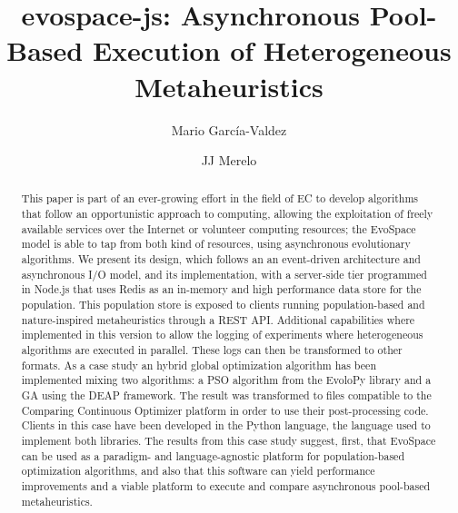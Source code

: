 \documentclass[sigconf]{acmart}
\begin{document}
\title{evospace-js: Asynchronous Pool-Based Execution of Heterogeneous Metaheuristics}


\author{Mario García-Valdez}

\author{JJ Merelo}

\begin{abstract}

This paper is part of an ever-growing effort in the field of EC to
develop algorithms that follow an opportunistic approach to computing, allowing the exploitation
of freely available services over the Internet or volunteer computing
resources; the EvoSpace model is able to tap from both kind of
resources, using asynchronous evolutionary algorithms. We present its
design, which follows an an event-driven 
architecture and asynchronous I/O model, and its implementation, with
a server-side tier programmed in Node.js that uses Redis as an
in-memory and high performance data store for the population. This
population store is exposed to clients running population-based and nature-inspired metaheuristics
through a REST API. Additional capabilities where implemented in this version to
allow the logging of experiments where heterogeneous algorithms are executed in parallel.
These logs can then be transformed to other formats. As a case study
an hybrid global optimization algorithm has been implemented mixing
two algorithms: a PSO algorithm from the EvoloPy library and a GA using the DEAP framework.
The result was transformed to files compatible to the Comparing Continuous Optimizer platform
in order to use their post-processing code. Clients in this case have been developed in 
the Python language, the language used to implement both
libraries. The results from this case study suggest, first, that
EvoSpace can be used as a paradigm- and language-agnostic platform for
population-based optimization algorithms, and also that this software can yield
performance improvements and a viable platform to execute and compare asynchronous pool-based
metaheuristics.   
\end{abstract}
\end{document}

